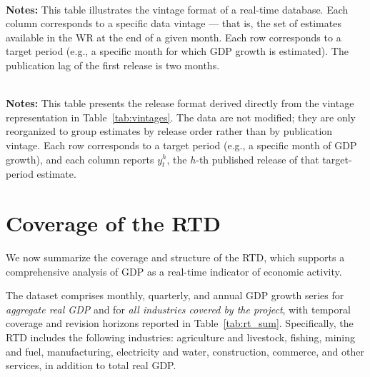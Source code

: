 \documentclass[a4paper, fleqn, 11pt]{article}
\begin{document}
\begin{table}[t!]
\caption{Dataset of monthly vintages}\label{tab:vintages}
\resizebox{\textwidth}{!}{%

}\\[2mm]
\footnotesize \textbf{Notes:} This table illustrates the vintage format of a real-time database. Each column corresponds to a specific data vintage — that is, the set of estimates available in the WR at the end of a given month. Each row corresponds to a target period (e.g., a specific month for which GDP growth is estimated). The publication lag of the first release is two months.
\end{table}


\begin{table}[!b]
\caption{Dataset of monthly releases}
\label{tab:releases}
\resizebox{\textwidth}{!}{\footnotesize{%

}
%
}\\[2mm]
\footnotesize \textbf{Notes:} This table presents the release format derived directly from the vintage representation in Table~\ref{tab:vintages}. The data are not modified; they are only reorganized to group estimates by release order rather than by publication vintage. Each row corresponds to a target period (e.g., a specific month of GDP growth), and each column reports $y_t^h$, the $h$-th published release of that target-period estimate.
\end{table}

\clearpage
\section{Coverage of the RTD}
\label{section:gdp_rtd_indicators}

We now summarize the coverage and structure of the RTD, which supports a comprehensive analysis of GDP as a real-time indicator of economic activity.

The dataset comprises monthly, quarterly, and annual GDP growth series for \emph{aggregate real GDP} and for \emph{all industries covered by the project}, with temporal coverage and revision horizons reported in Table~\ref{tab:rt_sum}. Specifically, the RTD includes the following industries: agriculture and livestock, fishing, mining and fuel, manufacturing, electricity and water, construction, commerce, and other services, in addition to total real GDP.
\end{document}
